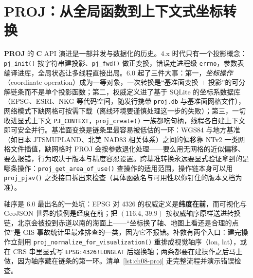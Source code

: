 \documentclass[12pt,a4paper,fontset=fandol]{ctexbook}
\newcommand{\Fn}[1]{\texttt{#1()}}
\newcommand{\Tp}[1]{\texttt{#1}}
\newcommand{\Lib}[1]{\textbf{#1}}
\newcommand{\Lang}[1]{\textsf{\bfseries #1}}
\newcommand{\CL}{\Lang{C}}
\begin{document}
\section{\Lib{PROJ}：从全局函数到上下文式坐标转换}

\Lib{PROJ} 的 \CL{} API 演进是一部并发与数据化的历史。4.x 时代只有一个投影概念：\Fn{pj\_init} 按字符串建投影、\Fn{pj\_fwd} 做正变换，错误走进程级 \Tp{errno}，参数表编译进库，全局状态让多线程直接出局。6.0 起了三件大事：第一，\emph{坐标操作}（coordinate operation）成为一等对象，一次转换是``基准面变换 $+$ 投影''的可分解链条而不是单个投影函数；第二，权威定义进了基于 SQLite 的坐标系数据库（EPSG、ESRI、NKG 等代码空间，随发行携带 \Tp{proj.db} 与基准面网格文件），网络模式下缺网格可按需下载（离线环境要谨慎处理这一步的失败）；第三，一切收进显式上下文 \Tp{PJ\_CONTEXT}，\Fn{proj\_create} 一族都吃句柄，线程各自建上下文即可安全并行。基准面变换是链条里最容易被低估的一环：WGS84 与地方基准（如日本 JTSMUPLAND、北美 NAD83 相关体系）之间的偏移靠 NTv2 一类网格文件插值，缺网格时 PROJ 会按参数退化处理——要么用无网格的近似偏移、要么报错，行为取决于版本与精度容忍设置。跨基准转换永远要显式验证拿到的是哪条操作：\Fn{proj\_get\_area\_of\_use} 查操作的适用范围，操作链本身可以用 \Fn{proj\_pjav} 之类接口拆出来检查（具体函数名与可用性以你钉住的版本文档为准）。

轴序是 6.0 最出名的一处坑：EPSG 对 4326 的权威定义是\textbf{纬度在前}，而可视化与 GeoJSON 世界的惯例是经度在前；把 $(116.4,\,39.9)$ 按权威轴序原样送进转换链，北京会被投到赤道以南的海面上——``坐标换了轴、地图上看还是合理的点位''是 GIS 事故统计里最难排查的一类，因为它不报错。补救有两个入口：建完操作立刻用 \Fn{proj\_normalize\_for\_visualization} 重排成视觉轴序（lon, lat），或在 CRS 串里显式写 \Tp{EPSG:4326!LONGLAT} 后缀换轴；两条都要在建操作之后马上做，因为轴序藏在链条的第一环。清单~\ref{lst:ch08-proj} 走完整流程并演示错误检查。
\end{document}
